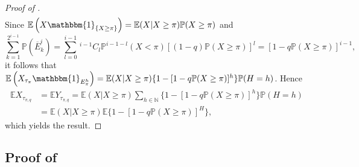\documentclass[11pt, a4paper, twoside]{article}
\newcommand{\NN}{\mathbb{N}}
\newcommand{\EE}{\mathbb{E}}
\newcommand{\PP}{\mathbb{P}}
\newcommand{\II}{\mathbbm{1}}
\numberwithin{equation}{section}
\begin{document}
\begin{proof}[Proof of ]
\begin{align*}
		\end{align*}
		Since $\EE\left( X\II_{\{X\ge \pi\}}\right)=\EE(X|X\ge\pi)\PP(X\ge\pi)$ and \[\sum_{k=1}^{2^{i-1}}\PP(\overline{E}_k^i)=\sum_{l=0}^{i-1}\,^{i-1}C_l\PP^{i-1-l}(X<\pi)[(1-q)\PP(X\ge\pi)]^l=[1-q\PP(X\ge\pi)]^{i-1},\]
		it follows that $\EE\left( X_{\tau_\pi}\II_{E_\pi^h}\right)=\EE(X|X\ge\pi)\{1-[1-q\PP(X\ge\pi)]^h\}\PP(H=h)$.
		Hence 
		\begin{align*}
			\EE X_{\tau_{\pi,q}}&=\EE Y_{\tau_{\pi,q}}=\EE(X|X\ge\pi)\sum_{h\in\NN}\{1-[1-q\PP(X\ge\pi)]^h\}\PP(H=h)\\&
			=\EE(X|X\ge\pi)\EE\{1-[1-q\PP(X\ge\pi)]^H\},
		\end{align*}
		which yields the result.
	\end{proof}
	
	\subsection{Proof of }\label{suppGclassGhorizon}
\end{document}
